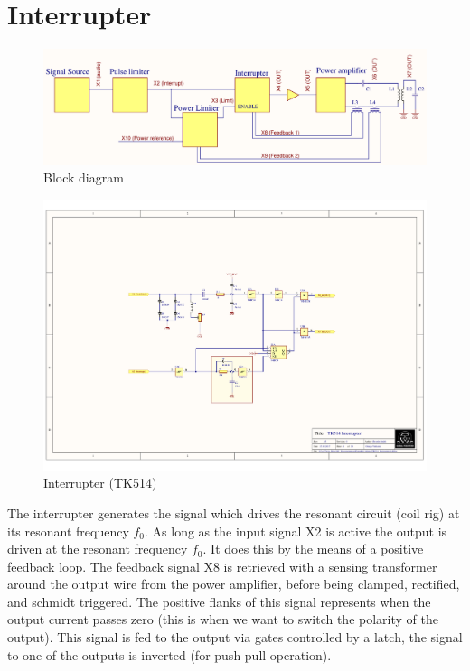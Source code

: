 \section{Interrupter}

\begin{figure}
    \centering
    \includegraphics[width=\textwidth]{Skjema/FunksjonsBlokkskjema.pdf}
    \caption{Block diagram}
    \label{fig:block}
\end{figure}

\begin{figure}[h]
    \centering
    \includegraphics[trim={6.5cm 5cm 7cm 5.5cm},clip,width=\textwidth]{Skjema/TK514_Interrupter.pdf}
    \caption{Interrupter (TK514)}
    \label{fig:interrupter}
\end{figure}

The interrupter generates the signal which drives the resonant circuit (coil rig) at its resonant frequency $f_0$. As long as the input signal X2 is active the output is driven at the resonant frequency $f_0$. It does this by the means of a positive feedback loop. The feedback signal X8 is retrieved with a sensing transformer around the output wire from the power amplifier, before being clamped, rectified, and schmidt triggered. The positive flanks of this signal represents when the output current passes zero (this is when we want to switch the polarity of the output). This signal is fed to the output via gates controlled by a latch, the signal to one of the outputs is inverted (for push-pull operation).

